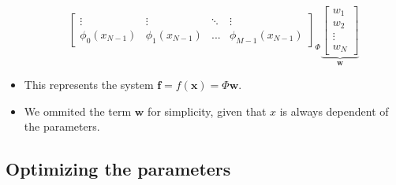 \begin{itemize}
\begin{equation*}
{\begin{bmatrix}
            \vdots & \vdots & \ddots & \vdots \\
            \phi_0(x_{N-1}) & \phi_1(x_{N-1}) & ... & \phi_{M-1}(x_{N-1})  
            \end{bmatrix}
        }_\Phi
        \underbrace{
            \begin{bmatrix}
            w_1 \\ w_2 \\  \vdots \\ w_N
            \end{bmatrix}
        }_\mathbf{w}
    \end{equation*}
    \item This represents the system $\mathbf{f} = f(\mathbf{x})=\Phi \mathbf{w}$.
    \item We ommited the term $\mathbf{w}$ for simplicity, given that $x$ is always dependent of the parameters.
\end{itemize}

\subsection{Optimizing the parameters}
\label{app:parameters-optimization}

